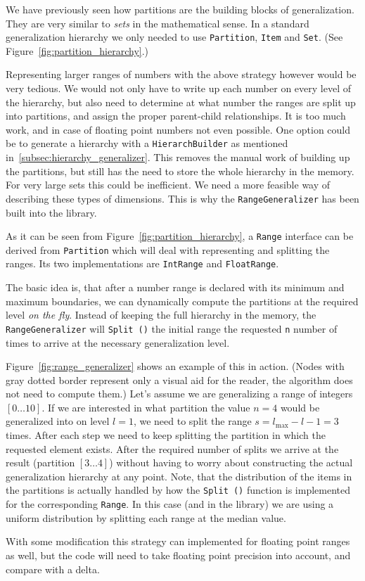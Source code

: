 \vspace{\baselineskip}


We have previously seen how partitions are the building blocks of generalization.
They are very similar to \textit{sets} in the mathematical sense.
In a standard generalization hierarchy we only needed to use \texttt{Partition}, \texttt{Item} and \texttt{Set}. (See Figure~\ref{fig:partition_hierarchy}.)

Representing larger ranges of numbers with the above strategy however would be very tedious.
We would not only have to write up each number on every level of the hierarchy, but also need to determine at what number the ranges are split up into partitions, and assign the proper parent-child relationships.
It is too much work, and in case of floating point numbers not even possible.
One option could be to generate a hierarchy with a \texttt{HierarchBuilder} as mentioned in~\ref{subsec:hierarchy_generalizer}. This removes the manual work of building up the partitions, but still has the need to store the whole hierarchy in the memory. For very large sets this could be inefficient.
We need a more feasible way of describing these types of dimensions.
This is why the \texttt{RangeGeneralizer} has been built into the library.

As it can be seen from Figure~\ref{fig:partition_hierarchy}, a \texttt{Range} interface can be derived from \texttt{Partition} which will deal with representing and splitting the ranges.
Its two implementations are \texttt{IntRange} and \texttt{FloatRange}.

The basic idea is, that after a number range is declared with its minimum and maximum boundaries, we can dynamically compute the partitions at the required level \emph{on the fly}.
Instead of keeping the full hierarchy in the memory, the \texttt{RangeGeneralizer} will \texttt{Split ()} the initial range the requested \texttt{n} number of times to arrive at the necessary generalization level.

\vspace{\baselineskip}


Figure~\ref{fig:range_generalizer} shows an example of this in action. (Nodes with gray dotted border represent only a visual aid for the reader, the algorithm does not need to compute them.) Let's assume we are generalizing a range of integers \([0\dots10]\).
If we are interested in what partition the value \(n=4\) would be generalized into on level \(l=1\), we need to split the range \(s=l_{\max}-l-1=3\) times.
After each step we need to keep splitting the partition in which the requested element exists.
After the required number of splits we arrive at the result (partition \([3\dots4]\)) without having to worry about constructing the actual generalization hierarchy at any point.
Note, that the distribution of the items in the partitions is actually handled by how the \texttt{Split ()} function is implemented for the corresponding \texttt{Range}.
In this case (and in the library) we are using a uniform distribution by splitting each range at the median value.

With some modification this strategy can implemented for floating point ranges as well, but the code will need to take floating point precision into account, and compare with a delta.
